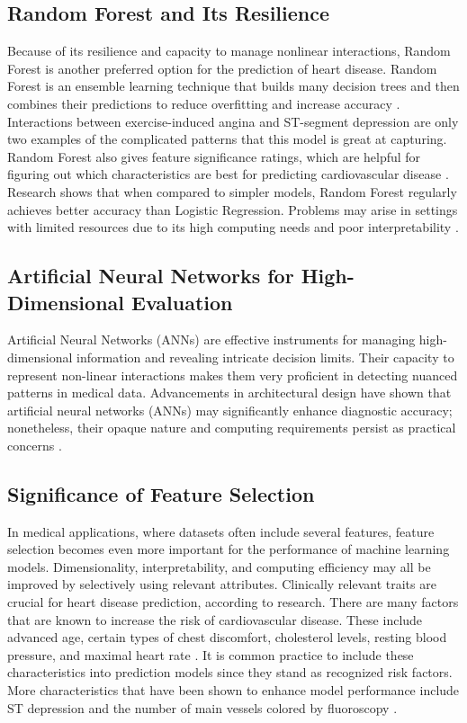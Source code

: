 \subsection{Random Forest and Its Resilience}
Because of its resilience and capacity to manage nonlinear interactions, Random Forest is another preferred option for the prediction of heart disease. Random Forest is an ensemble learning technique that builds many decision trees and then combines their predictions to reduce overfitting and increase accuracy \cite{ren2017forest}. Interactions between exercise-induced angina and ST-segment depression are only two examples of the complicated patterns that this model is great at capturing. Random Forest also gives feature significance ratings, which are helpful for figuring out which characteristics are best for predicting cardiovascular disease \cite{zhou2021machine}. Research shows that when compared to simpler models, Random Forest regularly achieves better accuracy than Logistic Regression. Problems may arise in settings with limited resources due to its high computing needs and poor interpretability \cite{soman2009machine}.

\subsection{Artificial Neural Networks for High-Dimensional Evaluation}
Artificial Neural Networks (ANNs) are effective instruments for managing high-dimensional information and revealing intricate decision limits. Their capacity to represent non-linear interactions makes them very proficient in detecting nuanced patterns in medical data. Advancements in architectural design have shown that artificial neural networks (ANNs) may significantly enhance diagnostic accuracy; nonetheless, their opaque nature and computing requirements persist as practical concerns \cite{roman-portabales2021systematic}.

\subsection{Significance of Feature Selection}
In medical applications, where datasets often include several features, feature selection becomes even more important for the performance of machine learning models. Dimensionality, interpretability, and computing efficiency may all be improved by selectively using relevant attributes. Clinically relevant traits are crucial for heart disease prediction, according to research. There are many factors that are known to increase the risk of cardiovascular disease. These include advanced age, certain types of chest discomfort, cholesterol levels, resting blood pressure, and maximal heart rate \cite{battineni2020diagnosis}. It is common practice to include these characteristics into prediction models since they stand as recognized risk factors. More characteristics that have been shown to enhance model performance include ST depression and the number of main vessels colored by fluoroscopy \cite{soman2009machine}.
